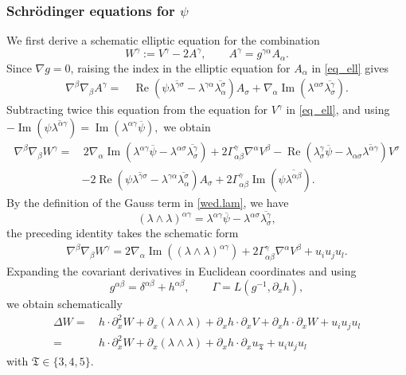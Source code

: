 \documentclass[11pt,letterpaper,reqno]{amsart}
\numberwithin{equation}{section}
\theoremstyle{definition}
\theoremstyle{remark}
\begin{document}
\subsubsection{Schr\"odinger equations for  \texorpdfstring{$\psi$}{psi}}
We  first derive a schematic elliptic equation for the combination
\[
W^\gamma:=V^\gamma-2A^\gamma,
\qquad
A^\gamma=g^{\gamma\alpha}A_\alpha.
\]
Since \(\nabla g=0\), raising the index in the elliptic equation for
\(A_\alpha\) in \eqref{eq_ell} gives
\begin{align*}
\nabla^\beta\nabla_\beta A^\gamma
=&\,
\operatorname{Re}
\left(
\psi\overline{\lambda^{\gamma\sigma}}
-
\lambda^{\gamma\alpha}
\overline{\lambda_\alpha^\sigma}
\right)A_\sigma
 +
\nabla_\alpha\operatorname{Im}
\left(
\lambda^{\alpha\sigma}
\overline{\lambda^\gamma_\sigma}
\right).
\end{align*}
Subtracting twice this equation from the equation for \(V^\gamma\) in
\eqref{eq_ell}, and using
\(
-\operatorname{Im}
\left(
\psi\overline{\lambda^{\alpha\gamma}}
\right)
=
\operatorname{Im}
\left(
\lambda^{\alpha\gamma}\overline{\psi}
\right),
\)
we obtain
\begin{align*}
\nabla^\beta\nabla_\beta W^\gamma
=&\,
2\nabla_\alpha\operatorname{Im}
\left(
\lambda^{\alpha\gamma}\overline{\psi}
-
\lambda^{\alpha\sigma}
\overline{\lambda^\gamma_\sigma}
\right)
+
2\Gamma_{\alpha\beta}^{\gamma}\nabla^\alpha V^\beta
-
\operatorname{Re}
\left(
\lambda^\gamma_\sigma\overline{\psi}
-
\lambda_{\alpha\sigma}\overline{\lambda^{\alpha\gamma}}
\right)V^\sigma
\\
&-
2\operatorname{Re}
\left(
\psi\overline{\lambda^{\gamma\sigma}}
-
\lambda^{\gamma\alpha}\overline{\lambda_\alpha^\sigma}
\right)A_\sigma
 +
2\Gamma_{\alpha\beta}^{\gamma}
\operatorname{Im}
\left(
\psi\overline{\lambda^{\alpha\beta}}
\right).
\end{align*}
By the definition of the Gauss term in \eqref{wed.lam}, we have
\[
(\lambda\wedge\lambda)^{\alpha\gamma}
=
\lambda^{\alpha\gamma}\overline{\psi}
-
\lambda^{\alpha\sigma}
\overline{\lambda^\gamma_\sigma},
\]
the preceding identity takes the schematic form
\begin{align*}
\nabla^\beta\nabla_\beta W^\gamma
=
2\nabla_\alpha\operatorname{Im}
\left(
(\lambda\wedge\lambda)^{\alpha\gamma}
\right)
+
2\Gamma_{\alpha\beta}^{\gamma}\nabla^\alpha V^\beta
+
u_i u_j u_l.
\end{align*}
Expanding the covariant derivatives in Euclidean coordinates and using
\[
g^{\alpha\beta}
=
\delta^{\alpha\beta}+h^{\alpha\beta},
\qquad
\Gamma=L(g^{-1},\partial_xh),
\]
we obtain schematically
\begin{align}
\Delta W
=&\,
h\cdot\partial_x^2W
+
\partial_x(\lambda\wedge\lambda)
+
\partial_xh\cdot\partial_xV
+
\partial_xh\cdot\partial_xW
+
u_i u_j u_l
\nonumber\\
=&\,
h\cdot\partial_x^2W
+
\partial_x(\lambda\wedge\lambda)
+
\partial_xh\cdot\partial_xu_{\mathfrak T}
+
u_i u_j u_l
\label{eq:W-final-schematic}
\end{align}
 with
\(\mathfrak T\in\{3,4,5\}\).
\end{document}
